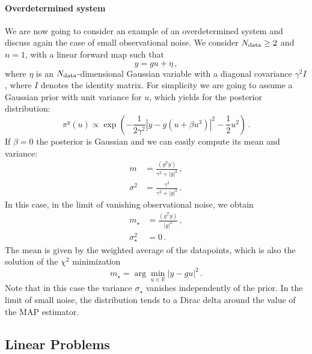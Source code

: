 \paragraph{Overdetermined system}
We are now going to consider an example of an overdetermined system and discuss
again the case of small observational noise. We consider $N_{\rm data}\geq 2$ and
$n=1$, with a linear forward map such that
\begin{equation}
 \label{eq:OverDetForwMap}
 y = g u  + \eta\, ,
\end{equation} 
where $\eta$ is an $N_{\rm data}$-dimensional Gaussian variable with a diagonal
covariance $\gamma^2 I$, where $I$ denotes the identity matrix. For simplicity
we are going to assume a Gaussian prior with unit variance for $u$, which yields
for the posterior distribution:
\begin{equation}
  \label{eq:OverDetPost}
  \pi^y(u) \propto 
    \exp\left(
      -\frac{1}{2\gamma^2} \left| y - g(u + \beta u^3)\right|^2
      -\frac12 u^2
    \right)\, .
\end{equation} 
If $\beta=0$ the posterior is Gaussian and we can easily compute its mean and variance: 
\begin{align}
  m &= \frac{(g^T y)}{\gamma^2 + |g|^2} \, , \\
  \sigma^2 &=
    \frac{\gamma^2}{\gamma^2 + |g|^2}\, .
\end{align}
In this case, in the limit of vanishing observational noise, we obtain
\begin{align}
  m_\star &= \frac{(g^T y)}{|g|^2} \, ,\\
  \sigma_\star^2 &= 0\, .
\end{align}
The mean is given by the weighted average of the datapoints, which is also the solution of the $\chi^2$ minimization
\begin{equation}
  m_\star = \arg\min_{u\in\mathbb{R}} \left|y - g u\right|^2\, .
\end{equation}
Note that in this case the variance $\sigma_\star$ vanishes independently of the
prior. In the limit of small noise, the distribution tends to a Dirac delta
around the value of the MAP estimator.  

\subsection{Linear Problems}
\label{eq:LinProbs}

